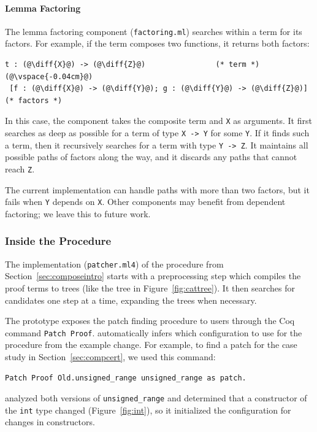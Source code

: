 \paragraph{Lemma Factoring} The lemma factoring component (\lstinline{factoring.ml}) searches within a term
for its factors. For example,
if the term composes two functions, it returns both factors:

\begin{lstlisting}[language=coq]
  t : (@\diff{X}@) -> (@\diff{Z}@)                (* term *)(@\vspace{-0.04cm}@)
 [f : (@\diff{X}@) -> (@\diff{Y}@); g : (@\diff{Y}@) -> (@\diff{Z}@)] (* factors *)
\end{lstlisting}
In this case, the component takes the composite term and \lstinline{X} as arguments.
It first searches as deep as possible for a term of type \lstinline{X -> Y} for some \lstinline{Y}.
If it finds such a term, then it recursively searches for a term with type \lstinline{Y -> Z}. 
It maintains all possible 
paths of factors along the way, and it discards any paths that cannot reach \lstinline{Z}.

The current implementation can handle paths
with more than two factors, but it fails when \lstinline{Y} depends on \lstinline{X}.
Other components may benefit from dependent factoring; we leave this to future work.

\subsubsection{Inside the Procedure}
\label{sec:algimpl}

The implementation (\lstinline{patcher.ml4}) of the procedure from Section~\ref{sec:composeintro} starts with a
preprocessing step which compiles the proof terms to trees (like the tree in Figure~\ref{fig:cattree}).
It then searches for candidates one step at a time, expanding the trees when necessary.

The \sysname prototype exposes the patch finding procedure to users through the Coq 
command \lstinline{Patch Proof}. \sysname automatically
infers which configuration to use for the procedure from the example change. For example, to
find a patch for the case study in Section~\ref{sec:compcert}, we
used this command:

\begin{lstlisting}[language=ml4]
  Patch Proof Old.unsigned_range unsigned_range as patch.
\end{lstlisting}
\sysname analyzed both versions of \lstinline{unsigned_range} and determined 
that a constructor of the \lstinline{int} type changed (Figure~\ref{fig:int}),
so it initialized the configuration for changes in constructors.

